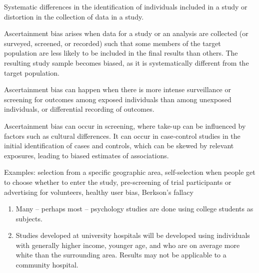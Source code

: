 Systematic differences in the identification of individuals included in a study or distortion in the collection of data in a study.



Ascertainment bias arises when data for a study or an analysis are collected (or surveyed, screened, or recorded) such that some members of the target population are less likely to be included in the final results than others. The resulting study sample becomes biased, as it is systematically different from the target population.

Ascertainment bias can happen when there is more intense surveillance or screening for outcomes among exposed individuals than among unexposed individuals, or differential recording of outcomes.

Ascertainment bias can occur in screening, where take-up can be influenced by factors such as cultural differences. It can occur in case-control studies in the initial identification of cases and controls, which can be skewed by relevant exposures, leading to biased estimates of associations.

Examples: selection from a specific geographic area, self-selection when people get to choose whether to enter the study, pre-screening of trial participants or advertising for volunteers, healthy user bias, Berkson's fallacy 

\begin{enumerate}
\item Many -- perhaps most -- psychology studies are done using college students as subjects.
\item Studies developed at university hospitals will be developed using individuals with generally higher income, younger age, and who are on average more white than the surrounding area. Results may not be applicable to a community hospital. 
\end{enumerate}


